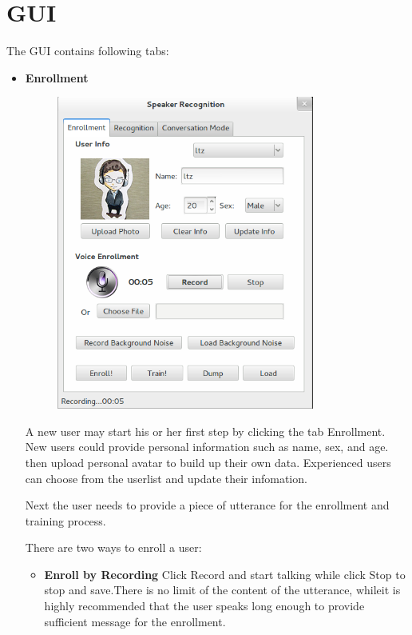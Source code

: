 \section{GUI}
The GUI contains following tabs:
\begin{itemize}
  \item \textbf{Enrollment} \\

    \begin{figure}[H]
      \centering
      \includegraphics[width=0.8\textwidth]{img/enrollment.png}
    \end{figure}

    A new user may start his or her first step by clicking the
    tab Enrollment. New users could provide personal information
    such as name, sex, and age. then upload personal avatar to
    build up their own data. Experienced users can choose from
    the userlist and update their infomation.

    Next the user needs to provide a piece of utterance for
    the enrollment and training process.

    There are two ways to enroll a user:
    \begin{itemize}
      \item \textbf{Enroll by Recording}
        Click Record and start talking while click Stop to stop
        and save.There is no limit of the content of the utterance,
        whileit is highly recommended that the user speaks long enough
        to provide sufficient message for the enrollment.


\end{itemize}
\end{itemize}
